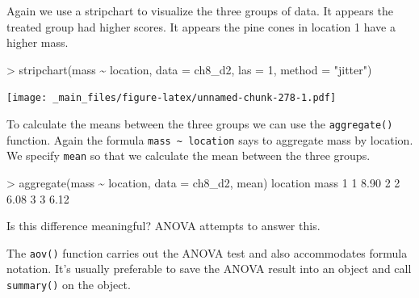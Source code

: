 \documentclass[
]{book}
\newenvironment{Shaded}{\begin{snugshade}}{\end{snugshade}}
\newcommand{\AttributeTok}[1]{\textcolor[rgb]{0.77,0.63,0.00}{#1}}
\newcommand{\DecValTok}[1]{\textcolor[rgb]{0.00,0.00,0.81}{#1}}
\newcommand{\FloatTok}[1]{\textcolor[rgb]{0.00,0.00,0.81}{#1}}
\newcommand{\FunctionTok}[1]{\textcolor[rgb]{0.00,0.00,0.00}{#1}}
\newcommand{\NormalTok}[1]{#1}
\newcommand{\SpecialCharTok}[1]{\textcolor[rgb]{0.00,0.00,0.00}{#1}}
\newcommand{\StringTok}[1]{\textcolor[rgb]{0.31,0.60,0.02}{#1}}
\begin{document}
Again we use a stripchart to visualize the three groups of data. It appears the treated group had higher scores. It appears the pine cones in location 1 have a higher mass.

\begin{Shaded}
\begin{Highlighting}[]
\SpecialCharTok{\textgreater{}} \FunctionTok{stripchart}\NormalTok{(mass }\SpecialCharTok{\textasciitilde{}}\NormalTok{ location, }\AttributeTok{data =}\NormalTok{ ch8\_d2, }\AttributeTok{las =} \DecValTok{1}\NormalTok{, }\AttributeTok{method =} \StringTok{"jitter"}\NormalTok{)}
\end{Highlighting}
\end{Shaded}

\texttt{[image: \_main\_files/figure-latex/unnamed-chunk-278-1.pdf]}

To calculate the means between the three groups we can use the \texttt{aggregate()} function. Again the formula \texttt{mass\ \textasciitilde{}\ location} says to aggregate mass by location. We specify \texttt{mean} so that we calculate the mean between the three groups.

\begin{Shaded}
\begin{Highlighting}[]
\SpecialCharTok{\textgreater{}} \FunctionTok{aggregate}\NormalTok{(mass }\SpecialCharTok{\textasciitilde{}}\NormalTok{ location, }\AttributeTok{data =}\NormalTok{ ch8\_d2, mean)}
\NormalTok{  location mass}
\DecValTok{1}        \DecValTok{1} \FloatTok{8.90}
\DecValTok{2}        \DecValTok{2} \FloatTok{6.08}
\DecValTok{3}        \DecValTok{3} \FloatTok{6.12}
\end{Highlighting}
\end{Shaded}

Is this difference meaningful? ANOVA attempts to answer this.

The \texttt{aov()} function carries out the ANOVA test and also accommodates formula notation. It's usually preferable to save the ANOVA result into an object and call \texttt{summary()} on the object.
\end{document}
